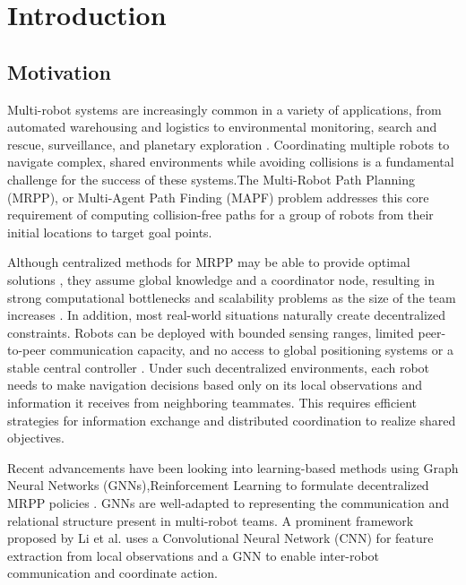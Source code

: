 \chapter{Introduction}
\label{chap:introduction}
\section{Motivation}
Multi-robot systems are increasingly common in a variety of applications, from automated warehousing and logistics \cite{Wurman2008} to environmental monitoring, search and rescue, surveillance, and planetary exploration \cite{Parker2008}. 
Coordinating multiple robots to navigate complex, shared environments while avoiding collisions is a fundamental challenge for the success of these systems.The Multi-Robot Path Planning (MRPP), or Multi-Agent Path Finding (MAPF) \cite{Stern2019MAPFSurvey} problem addresses this core requirement of computing collision-free paths for a group of robots from their initial locations to target goal points.

Although centralized methods for MRPP may be able to provide optimal solutions \cite{Sharon2015CBS}, they assume global knowledge and a coordinator node, resulting in strong computational bottlenecks and scalability problems as the size of the team increases \cite{Standley2011Complete}. In addition, most real-world situations naturally create decentralized constraints. Robots can be deployed with bounded sensing ranges, limited peer-to-peer communication capacity, and no access to global positioning systems or a stable central controller \cite{Li2021GNNCoordination, VanDenBerg2008ORCA}. Under such decentralized environments, each robot needs to make navigation decisions based only on its local observations and information it receives from neighboring teammates. This requires efficient strategies for information exchange and distributed coordination to realize shared objectives.

Recent advancements have been looking into learning-based methods using Graph Neural Networks (GNNs),Reinforcement Learning to formulate decentralized MRPP policies \cite{Li2021GNNCoordination, Tolstay2020LearningDecentralized}. GNNs are well-adapted to representing the communication and relational structure present in multi-robot teams. A prominent framework proposed by Li et al. \cite{Li2021GNNCoordination} uses a Convolutional Neural Network (CNN) for feature extraction from local observations and a GNN to enable inter-robot communication and coordinate action. 

